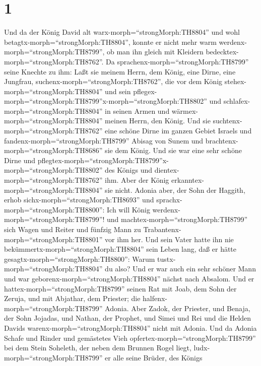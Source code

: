 \hypertarget{section}{%
\section{1}\label{section}}

 Und da der König David alt
warx-morph=``strongMorph:TH8804'' und wohl
betagtx-morph=``strongMorph:TH8804'', konnte er nicht mehr warm
werdenx-morph=``strongMorph:TH8799'', ob man ihn gleich mit Kleidern
bedecktex-morph=``strongMorph:TH8762''.  Da
sprachenx-morph=``strongMorph:TH8799'' seine Knechte zu ihm: Laßt sie
meinem Herrn, dem König, eine Dirne, eine Jungfrau,
suchenx-morph=``strongMorph:TH8762'', die vor dem König
stehex-morph=``strongMorph:TH8804'' und sein
pflegex-morph=``strongMorph:TH8799''x-morph=``strongMorph:TH8802'' und
schlafex-morph=``strongMorph:TH8804'' in seinen Armen und
wärmex-morph=``strongMorph:TH8804'' meinen Herrn, den König.
 Und sie suchtenx-morph=``strongMorph:TH8762'' eine schöne
Dirne im ganzen Gebiet Israels und fandenx-morph=``strongMorph:TH8799''
Abisag von Sunem und brachtenx-morph=``strongMorph:TH8686'' sie dem
König.  Und sie war eine sehr schöne Dirne und
pflegtex-morph=``strongMorph:TH8799''x-morph=``strongMorph:TH8802'' des
Königs und dientex-morph=``strongMorph:TH8762'' ihm. Aber der König
erkanntex-morph=``strongMorph:TH8804'' sie nicht.  Adonia
aber, der Sohn der Haggith, erhob sichx-morph=``strongMorph:TH8693'' und
sprachx-morph=``strongMorph:TH8800'': Ich will König
werdenx-morph=``strongMorph:TH8799''! und
machtex-morph=``strongMorph:TH8799'' sich Wagen und Reiter und fünfzig
Mann zu Trabantenx-morph=``strongMorph:TH8801'' vor ihm her.
 Und sein Vater hatte ihn nie
bekümmertx-morph=``strongMorph:TH8804'' sein Leben lang, daß er hätte
gesagtx-morph=``strongMorph:TH8800'': Warum
tustx-morph=``strongMorph:TH8804'' du also? Und er war auch ein sehr
schöner Mann und war geborenx-morph=``strongMorph:TH8804'' nächst nach
Absalom.  Und er hattex-morph=``strongMorph:TH8799'' seinen
Rat mit Joab, dem Sohn der Zeruja, und mit Abjathar, dem Priester; die
halfenx-morph=``strongMorph:TH8799'' Adonia.  Aber Zadok,
der Priester, und Benaja, der Sohn Jojadas, und Nathan, der Prophet, und
Simei und Rei und die Helden Davids warenx-morph=``strongMorph:TH8804''
nicht mit Adonia.  Und da Adonia Schafe und Rinder und
gemästetes Vieh opfertex-morph=``strongMorph:TH8799'' bei dem Stein
Soheleth, der neben dem Brunnen Rogel liegt,
ludx-morph=``strongMorph:TH8799'' er alle seine Brüder, des Königs
